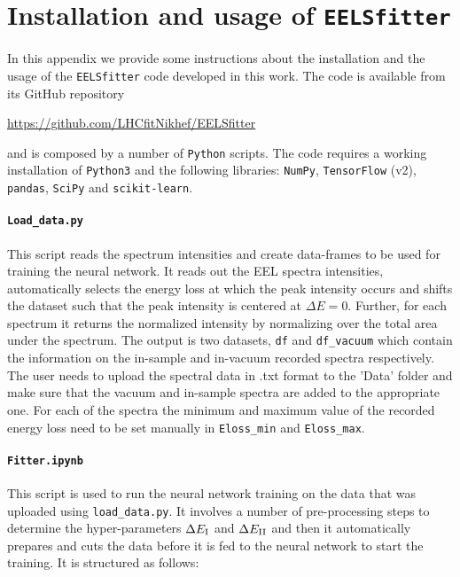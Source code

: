 
\section{Installation and usage of {\tt EELSfitter}}
\label{sec:installation}

In this appendix we provide some instructions about the installation
and the usage of the {\tt EELSfitter} code developed
in this work.
%
The code is available from its GitHub repository
\begin{center}
\url{https://github.com/LHCfitNikhef/EELSfitter}
\end{center}
and is composed by a number of {\tt Python} scripts.
%
The code requires a working installation of {\tt Python3} and the following
libraries: {\tt NumPy}, {\tt TensorFlow} (v2), {\tt pandas}, {\tt SciPy} and {\tt scikit-learn}.  


\noindent
\paragraph{\tt Load\_data.py}
%
This script reads the spectrum
intensities and create data-frames to be used for training the neural network.
%
It reads out the EEL spectra intensities, automatically selects the energy loss
at which the peak intensity occurs and shifts the dataset such that
the peak intensity is centered at $\Delta E =$0. 
%
Further, for each spectrum it returns the normalized intensity by normalizing
over the total area under the spectrum. 
%
The output is two datasets, {\tt df} and {\tt df\_vacuum} which contain the 
information on the in-sample and in-vacuum recorded spectra respectively. 
%
The user needs to upload the spectral data in .txt format to the 'Data' folder
and make sure that the vacuum and in-sample spectra are added to the appropriate one.
%
For each of the spectra the minimum and maximum value of the recorded energy 
loss need to be set manually in {\tt Eloss\_min} and {\tt Eloss\_max}.

\noindent
\paragraph{\tt Fitter.ipynb}
%
This script is used to run the neural network training on the data that was 
uploaded using {\tt load\_data.py}.
%
It involves a number of pre-processing steps to determine the hyper-parameters $\Delta E_{\rm I}$
and $\Delta E_{\rm II}$ and then
it automatically prepares and cuts the data before it is fed
to the neural network to start the training.
%
It is structured as follows:

